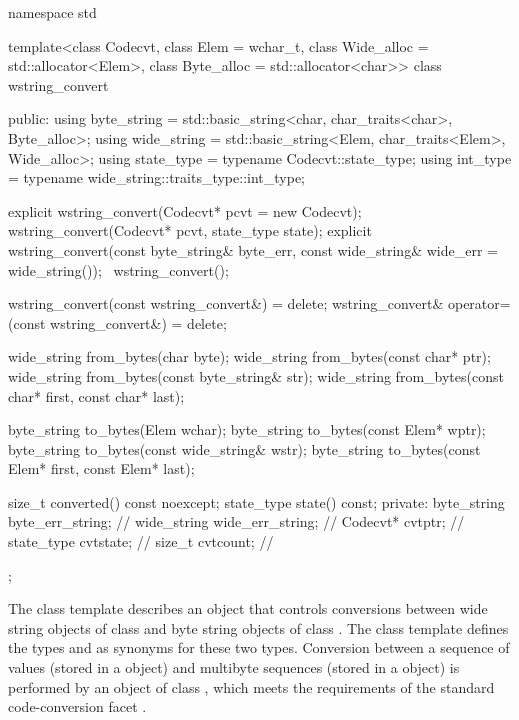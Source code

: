 %
\begin{codeblock}
namespace std {
template<class Codecvt, class Elem = wchar_t,
    class Wide_alloc = std::allocator<Elem>,
    class Byte_alloc = std::allocator<char>> class wstring_convert {
  public:
    using byte_string = std::basic_string<char, char_traits<char>, Byte_alloc>;
    using wide_string = std::basic_string<Elem, char_traits<Elem>, Wide_alloc>;
    using state_type  = typename Codecvt::state_type;
    using int_type    = typename wide_string::traits_type::int_type;

    explicit wstring_convert(Codecvt* pcvt = new Codecvt);
    wstring_convert(Codecvt* pcvt, state_type state);
    explicit wstring_convert(const byte_string& byte_err,
                             const wide_string& wide_err = wide_string());
    ~wstring_convert();

    wstring_convert(const wstring_convert&) = delete;
    wstring_convert& operator=(const wstring_convert&) = delete;

    wide_string from_bytes(char byte);
    wide_string from_bytes(const char* ptr);
    wide_string from_bytes(const byte_string& str);
    wide_string from_bytes(const char* first, const char* last);

    byte_string to_bytes(Elem wchar);
    byte_string to_bytes(const Elem* wptr);
    byte_string to_bytes(const wide_string& wstr);
    byte_string to_bytes(const Elem* first, const Elem* last);

    size_t converted() const noexcept;
    state_type state() const;
  private:
    byte_string byte_err_string;    // \expos
    wide_string wide_err_string;    // \expos
    Codecvt* cvtptr;                // \expos
    state_type cvtstate;            // \expos
    size_t cvtcount;                // \expos
  };
}
\end{codeblock}

\pnum
The class template describes an object that controls conversions between wide
string objects of class  and byte string objects of class . The class template defines the types
 and  as synonyms for these two types.
Conversion between a sequence of  values (stored in a
 object) and multibyte sequences (stored in a
 object) is performed by an object of class
, which meets the
requirements of the standard code-conversion facet .

